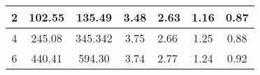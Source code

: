 \begin{table}
{\begin{tabular}{|c|c|c|c|l|c|c|}
2                                                                             & 102.55                                                                                                                                                                                                                       & 135.49                                                                                                                                                                                                                       & 3.48                                                                                                                        & 2.63                                                                                                                                              & 1.16                                                                                   & 0.87                                                                                   \\ \hline
4                                                                             & 245.08                                                                                                                                                                                                                       & 345.342                                                                                                                                                                                                                      & 3.75                                                                                                                        & 2.66                                                                                                                                              & 1.25                                                                                   & 0.88                                                                                   \\ \hline
6                                                                             & 440.41                                                                                                                                                                                                                        & 594.30                                                                                                                                                                                                                     & 3.74                                                                                                                         & 2.77                                                                                                                                              & 1.24                                                                                    & 0.92                                                                                   \\ \hline

\end{tabular}}
\end{table}
